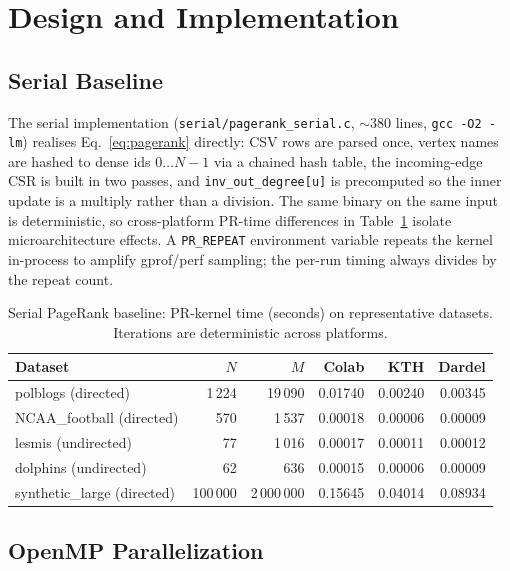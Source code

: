 \documentclass[11pt]{article}
\begin{document}
\section{Design and Implementation}
\label{sec:design}

\subsection{Serial Baseline}
\label{subsec:serial}

The serial implementation (\texttt{serial/pagerank\_serial.c}, $\sim 380$
lines, \texttt{gcc -O2 -lm}) realises Eq.~\ref{eq:pagerank} directly:
CSV rows are parsed once, vertex names are hashed to dense ids
$0\ldots N{-}1$ via a chained hash table, the incoming-edge CSR is built
in two passes, and \texttt{inv\_out\_degree[u]} is precomputed so the
inner update is a multiply rather than a division. The same binary on
the same input is deterministic, so cross-platform PR-time differences
in Table~\ref{tab:serial-baseline} isolate microarchitecture effects.
A \texttt{PR\_REPEAT} environment variable repeats the kernel in-process
to amplify gprof/perf sampling; the per-run timing always divides by the
repeat count.

\begin{table}[H]
\centering
\caption{Serial PageRank baseline: PR-kernel time (seconds) on
representative datasets. Iterations are deterministic across platforms.}
\label{tab:serial-baseline}
\small
\begin{tabular}{lrrrrr}
\toprule
Dataset & $N$ & $M$ & Colab & KTH & Dardel \\
\midrule
polblogs (directed)              & 1\,224   & 19\,090     & 0.01740 & 0.00240 & 0.00345 \\
NCAA\_football (directed)        & 570      & 1\,537      & 0.00018 & 0.00006 & 0.00009 \\
lesmis (undirected)              & 77       & 1\,016      & 0.00017 & 0.00011 & 0.00012 \\
dolphins (undirected)            & 62       & 636         & 0.00015 & 0.00006 & 0.00009 \\
synthetic\_large (directed)      & 100\,000 & 2\,000\,000 & 0.15645 & 0.04014 & 0.08934 \\
\bottomrule
\end{tabular}
\end{table}

\subsection{OpenMP Parallelization}
\label{subsec:openmp}
\end{document}
